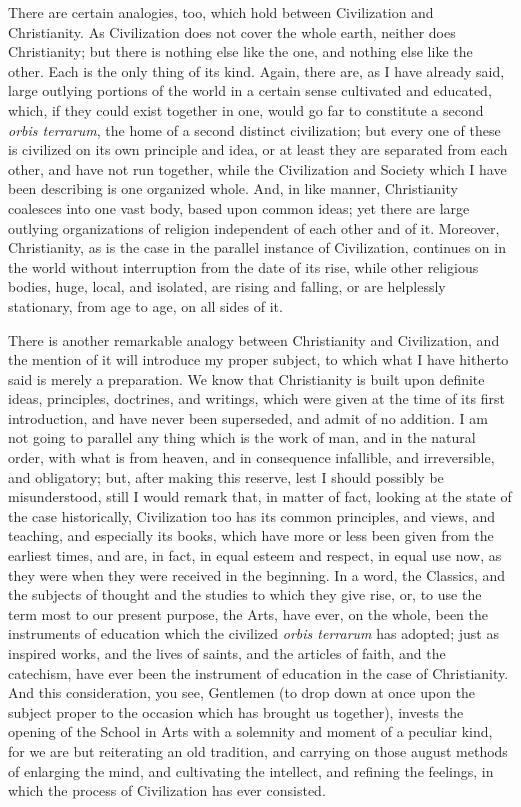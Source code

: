 There are certain analogies, too, which hold between Civilization
and Christianity. As Civilization does not cover the whole earth,
neither does Christianity; but there is nothing else like the one, and
nothing else like the other. Each is the only thing of its kind.
Again, there are, as I have already said, large outlying portions of
the world in a certain sense cultivated and educated, which, if they
could exist together in one, would go far to constitute a second \emph{orbis
terrarum}, the home of a second distinct civilization; but every
one of these is civilized on its own principle and idea, or at least
they are separated from each other, and have not run together, while
the Civilization and Society which I have been describing is one
organized whole. And, in like manner, Christianity coalesces into one
vast body, based upon common ideas; yet there are large outlying
organizations of religion independent of each other and of it.
Moreover, Christianity, as is the case in the parallel instance of
Civilization, continues on in the world without interruption from the
date of its rise, while other religious bodies, huge, local, and
isolated, are rising and falling, or are helplessly stationary, from
age to age, on all sides of it.

There is another remarkable analogy between Christianity and
Civilization, and the mention of it will introduce my proper subject,
to which what I have hitherto said is merely a preparation. We know
that Christianity is built upon definite ideas, principles,
doctrines, and writings, which were given at the time of its first
introduction, and have never been superseded, and admit of no
addition. I am not going to parallel any thing which is the work of
man, and in the natural order, with what is from heaven, and in
consequence infallible, and irreversible, and obligatory; but, after
making this reserve, lest I should possibly be misunderstood, still I
would remark that, in matter of fact, looking at the state of the case
historically, Civilization too has its common principles, and views,
and teaching, and especially its books, which have more or less been
given from the earliest times, and are, in fact, in equal esteem and
respect, in equal use now, as they were when they were received in the
beginning. In a word, the Classics, and the subjects of thought and
the studies to which they give rise, or, to use the term most to our
present purpose, the Arts, have ever, on the whole, been the
instruments of education which the civilized \emph{orbis terrarum} has
adopted; just as inspired works, and the lives of saints, and the
articles of faith, and the catechism, have ever been the instrument of
education in the case of Christianity. And this consideration, you
see, Gentlemen (to drop down at once upon the subject proper to the
occasion which has brought us together), invests the opening of the
School in Arts with a solemnity and moment of a peculiar kind, for we
are but reiterating an old tradition, and carrying on those august
methods of enlarging the mind, and cultivating the intellect, and
refining the feelings, in which the process of Civilization has ever
consisted.

